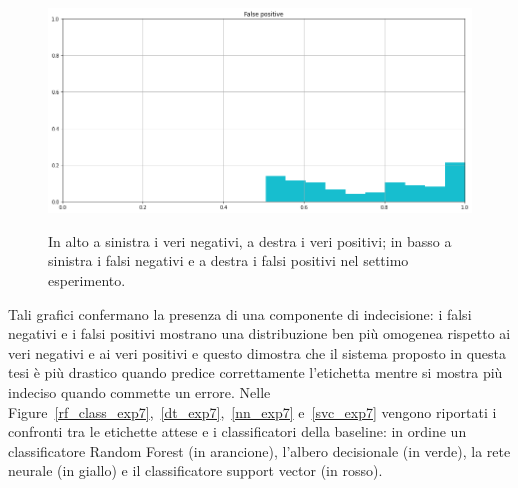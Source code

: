 \documentclass[12pt]{report}
\theoremstyle{definition}
\begin{document}
\begin{figure}
   \begin{minipage}{0.48\textwidth}
     \includegraphics[width=\linewidth]{images/experiment kaggle/fp.png}\label{fp_k}
   \end{minipage}
   \caption{In alto a sinistra i veri negativi, a destra i veri positivi; in basso a sinistra i falsi negativi e a destra i falsi positivi nel settimo esperimento.}
   \label{4cases_exp7}
\end{figure}
Tali grafici confermano la presenza di una componente di indecisione: i falsi negativi e i falsi positivi mostrano una distribuzione ben più omogenea rispetto ai veri negativi e ai veri positivi e questo dimostra che il sistema proposto in questa tesi è più drastico quando predice correttamente l'etichetta mentre si mostra più indeciso quando commette un errore. Nelle Figure~\ref{rf_class_exp7},~\ref{dt_exp7},~\ref{nn_exp7} e~\ref{svc_exp7} vengono riportati i confronti tra le etichette attese e i classificatori della baseline: in ordine un classificatore Random Forest (in arancione), l'albero decisionale (in verde), la rete neurale (in giallo) e il classificatore support vector (in rosso).
\end{document}
